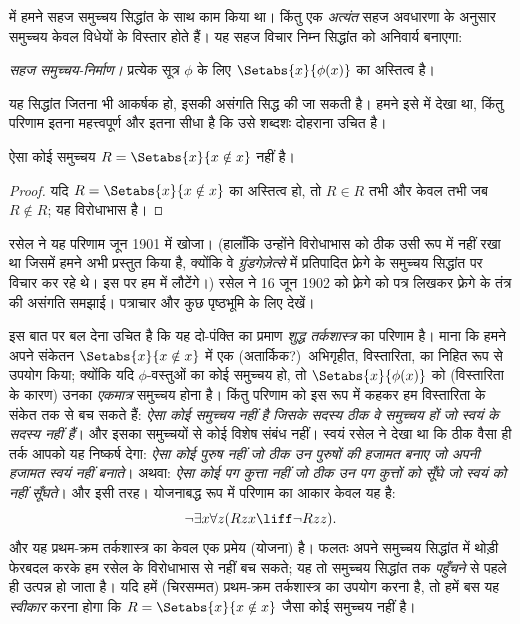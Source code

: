 \documentclass[../../../include/open-logic-section]{subfiles}
\begin{document}

 में हमने सहज समुच्चय सिद्धांत के साथ काम किया था।
किंतु एक \emph{अत्यंत} सहज अवधारणा के अनुसार समुच्चय केवल विधेयों के
विस्तार होते हैं। यह सहज विचार निम्न सिद्धांत को अनिवार्य बनाएगा:

\begin{defish}
  \emph{सहज समुच्चय-निर्माण।} प्रत्येक सूत्र $\phi$ के लिए
  $\Setabs{x}{\phi(x)}$ का अस्तित्व है।
\end{defish}

यह सिद्धांत जितना भी आकर्षक हो, इसकी असंगति सिद्ध की जा सकती है। हमने इसे
 में देखा था, किंतु परिणाम इतना महत्त्वपूर्ण और
इतना सीधा है कि उसे शब्दशः दोहराना उचित है।

\begin{thm}[रसेल का विरोधाभास]
ऐसा कोई समुच्चय $R = \Setabs{x}{x \notin x}$ नहीं है।
\end{thm}

\begin{proof}
यदि $R = \Setabs{x}{x \notin x}$ का अस्तित्व हो, तो
$R \in R$ तभी और केवल तभी जब $R \notin R$; यह विरोधाभास है।
\end{proof}

रसेल ने यह परिणाम जून 1901 में खोजा। (हालाँकि उन्होंने विरोधाभास को ठीक
उसी रूप में नहीं रखा था जिसमें हमने अभी प्रस्तुत किया है, क्योंकि वे
\emph{ग्रुंडगेज़ेत्से} में प्रतिपादित फ़्रेगे के समुच्चय सिद्धांत पर विचार कर
रहे थे। इस पर हम  में लौटेंगे।) रसेल ने 16 जून 1902 को
फ़्रेगे को पत्र लिखकर फ़्रेगे के तंत्र की असंगति समझाई। पत्राचार और कुछ
पृष्ठभूमि के लिए \citet[pp.~124--8]{Heijenoort1967} देखें।

इस बात पर बल देना उचित है कि यह दो-पंक्ति का प्रमाण \emph{शुद्ध तर्कशास्त्र}
का परिणाम है। माना कि हमने अपने संकेतन $\Setabs{x}{x \notin x}$ में एक
(अतार्किक?)\ अभिगृहीत, विस्तारिता, का निहित रूप से उपयोग किया; क्योंकि यदि
$\phi$-वस्तुओं का कोई समुच्चय हो, तो $\Setabs{x}{\phi(x)}$ को (विस्तारिता
के कारण) उनका \emph{एकमात्र} समुच्चय होना है। किंतु परिणाम को इस रूप में
कहकर हम विस्तारिता के संकेत तक से बच सकते हैं: \emph{ऐसा कोई समुच्चय नहीं
है जिसके सदस्य ठीक वे समुच्चय हों जो स्वयं के सदस्य नहीं हैं}। और इसका
समुच्चयों से कोई विशेष संबंध नहीं। स्वयं रसेल ने देखा था कि ठीक वैसा ही
तर्क आपको यह निष्कर्ष देगा: \emph{ऐसा कोई पुरुष नहीं जो ठीक उन पुरुषों की
हजामत बनाए जो अपनी हजामत स्वयं नहीं बनाते}। अथवा: \emph{ऐसा कोई पग कुत्ता
नहीं जो ठीक उन पग कुत्तों को सूँघे जो स्वयं को नहीं सूँघते}। और इसी तरह।
योजनाबद्ध रूप में परिणाम का आकार केवल यह है:
\[
\lnot \exists x \forall z(Rzx \liff \lnot R zz).
\]
और यह प्रथम-क्रम तर्कशास्त्र का केवल एक प्रमेय (योजना) है। फलतः अपने
समुच्चय सिद्धांत में थोड़ी फेरबदल करके हम रसेल के विरोधाभास से नहीं बच सकते;
यह तो समुच्चय सिद्धांत तक \emph{पहुँचने} से पहले ही उत्पन्न हो जाता है। यदि
हमें (चिरसम्मत) प्रथम-क्रम तर्कशास्त्र का उपयोग करना है, तो हमें बस यह
\emph{स्वीकार} करना होगा कि $R = \Setabs{x}{x\notin x}$ जैसा कोई समुच्चय
नहीं है।
\end{document}
